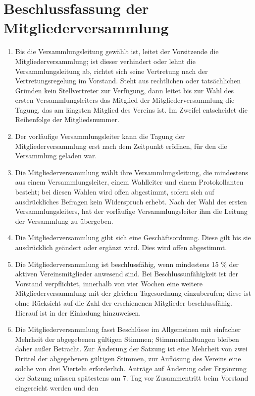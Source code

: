 \chapter{Beschlussfassung der Mitgliederversammlung}
\begin{enumerate}
	\item Bis die Versammlungsleitung gewählt ist, leitet der Vorsitzende die Mitgliederversammlung; ist dieser verhindert oder lehnt die Versammlungsleitung ab, richtet sich seine Vertretung nach der Vertretungsregelung im Vorstand. Steht aus rechtlichen oder tatsächlichen Gründen kein Stellvertreter zur Verfügung, dann leitet bis zur Wahl des ersten Versammlungsleiters das Mitglied der Mitgliederversammlung die Tagung, das am längsten Mitglied des Vereins ist. Im
		Zweifel entscheidet die Reihenfolge der Mitgliedsnummer.
	\item Der vorläufige Versammlungsleiter kann die Tagung der Mitgliederversammlung erst nach dem Zeitpunkt eröffnen, für den die Versammlung geladen war.
	\item Die Mitgliederversammlung wählt ihre Versammlungsleitung, die mindestens aus einem Versammlungsleiter, einem Wahlleiter und einem Protokollanten besteht; bei diesen Wahlen wird offen abgestimmt, sofern sich auf ausdrückliches Befragen kein Widerspruch erhebt. Nach der Wahl des ersten Versammlungsleiters, hat der vorläufige Versammlungsleiter ihm die Leitung der Versammlung zu übergeben.
	\item Die Mitgliederversammlung gibt sich eine Geschäftsordnung. Diese gilt bis sie ausdrücklich geändert oder ergänzt wird. Dies wird offen abgestimmt.
	\item Die Mitgliederversammlung ist beschlussfähig, wenn mindestens 15 \% der aktiven Vereinsmitglieder anwesend sind. Bei Beschlussunfähigkeit ist der Vorstand verpflichtet, innerhalb von vier Wochen eine weitere Mitgliederversammlung mit der gleichen Tagesordnung einzuberufen; diese ist ohne Rücksicht auf die Zahl der erschienenen Mitglieder beschlussfähig. Hierauf ist in der Einladung hinzuweisen.
	\item Die Mitgliederversammlung fasst Beschlüsse im Allgemeinen mit einfacher Mehrheit der abgegebenen gültigen Stimmen; Stimmenthaltungen bleiben daher außer Betracht. Zur Änderung der Satzung ist eine Mehrheit von zwei Drittel der abgegebenen gültigen Stimmen, zur Auflösung des Vereins eine solche von drei Vierteln erforderlich. Anträge auf Änderung oder Ergänzung der Satzung müssen spätestens am 7. Tag vor Zusammentritt beim Vorstand eingereicht werden und den

\end{enumerate}
